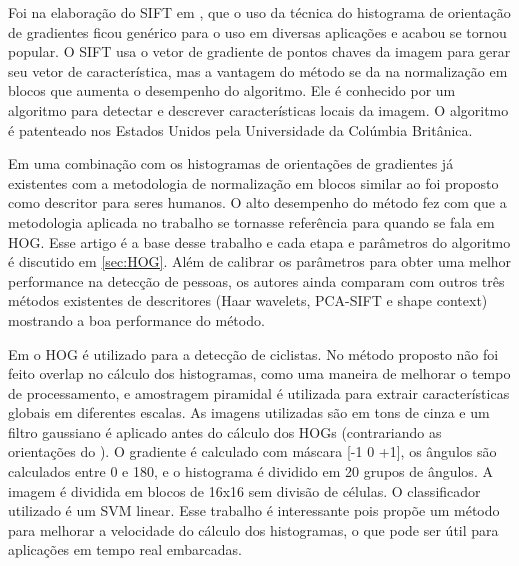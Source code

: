 Foi na elaboração do SIFT em \cite{lowe2004distinctive}, que o uso da técnica do histograma de orientação de gradientes ficou genérico para o uso em diversas aplicações e acabou se tornou popular. O SIFT usa o vetor de gradiente de pontos chaves da imagem para gerar seu vetor de característica, mas a vantagem do método se da na normalização em blocos que aumenta o desempenho do algoritmo. Ele é conhecido por um algoritmo para detectar e descrever características locais da imagem. O algoritmo é patenteado nos Estados Unidos pela Universidade da Colúmbia Britânica.

Em \cite{dalal2005histograms} uma combinação com os histogramas de orientações de gradientes já existentes com a metodologia de normalização em blocos similar ao \cite{lowe2004distinctive} foi proposto como descritor para seres humanos. O alto desempenho do método fez com que a metodologia aplicada no trabalho se tornasse referência para quando se fala em HOG.  Esse artigo é a base desse trabalho e cada etapa e parâmetros do algoritmo é discutido em \ref{sec:HOG}. Além de calibrar os parâmetros para obter uma melhor performance na detecção de pessoas, os autores ainda comparam com outros três métodos existentes de descritores (Haar wavelets, PCA-SIFT e shape context) mostrando a boa performance do método.

Em \cite{li2010effective} o HOG é utilizado para a detecção de ciclistas. No método proposto não foi feito overlap no cálculo dos histogramas, como uma maneira de melhorar o tempo de processamento, e amostragem piramidal é utilizada para extrair características globais em diferentes escalas. As imagens utilizadas são em tons de cinza e um filtro gaussiano é aplicado antes do cálculo dos HOGs (contrariando as orientações do ). O gradiente é calculado com máscara [-1 0 +1], os ângulos são calculados entre 0 e 180, e o histograma é dividido em 20 grupos de ângulos. A imagem é dividida em blocos de 16x16 sem divisão de células. O classificador utilizado é um SVM linear. Esse trabalho é interessante pois propõe um método para melhorar a velocidade do cálculo dos histogramas, o que pode ser útil para aplicações em tempo real embarcadas.

